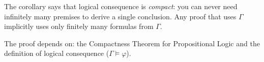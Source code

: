 \begin{remark*}
The corollary says that logical consequence is \emph{compact}: you can never
need infinitely many premises to derive a single conclusion. Any proof that uses
$\Gamma$ implicitly uses only finitely many formulas from $\Gamma$.
\end{remark*}

\begin{remark*}[Dependencies]
The proof depends on: the Compactness Theorem for Propositional Logic and the
definition of logical consequence ($\Gamma \models \varphi$).
\end{remark*}
